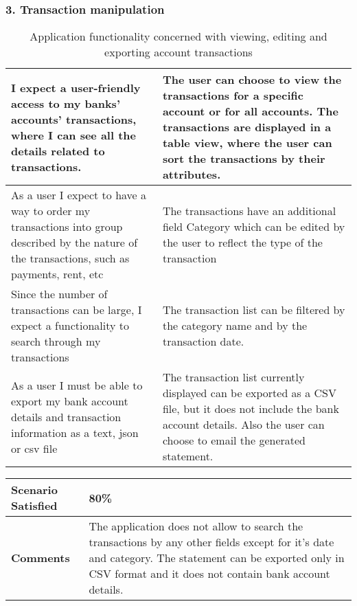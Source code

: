 \subsubsection{3. Transaction manipulation}
\begin{longtable}{|m{7cm}|l|} 
\caption[]{Application functionality concerned with viewing, editing and exporting account transactions} 
\\\hline 
\multicolumn{1}{|p{7cm}|}{I expect a user-friendly access to my banks' accounts' transactions, where I can see all the details related to transactions.} & \multicolumn{1}{p{7cm}|}{The user can choose to view the transactions for a specific account or for all accounts. The transactions are displayed in a table view, where the user can sort the transactions by their attributes.}\\ \hline
\multicolumn{1}{|p{7cm}|}{As a user I expect to have a way to order my transactions into group described by the nature of the transactions, such as payments, rent, etc} & \multicolumn{1}{p{7cm}|}{The transactions have an additional field Category which can be edited by the user to reflect the type of the transaction}\\ \hline
\multicolumn{1}{|p{7cm}|}{Since the number of transactions can be large, I expect a functionality to search through my transactions} & \multicolumn{1}{p{7cm}|}{The transaction list can be filtered by the category name and by the transaction date.}\\ \hline
\multicolumn{1}{|p{7cm}|}{As a user I must be able to export my bank account details and transaction information as a text, json or csv file} & \multicolumn{1}{p{7cm}|}{The transaction list currently displayed can be exported as a CSV file, but it does not include the bank account details. Also the user can choose to email the generated statement.}\\ \hline
\end{longtable}

\begin{longtable}{|m{4cm}|l|}\hline 
\cellcolor[HTML]{C0C0C0}\textbf{Scenario Satisfied} & \multicolumn{1}{p{13cm}|}{80\%}\\ \hline
\cellcolor[HTML]{C0C0C0}\textbf{Comments} & \multicolumn{1}{p{13cm}|}{The application does not allow to search the transactions by any other fields except for it's date and category. The statement can be exported only in CSV format and it does not contain bank account details.}\\ \hline
\end{longtable}


